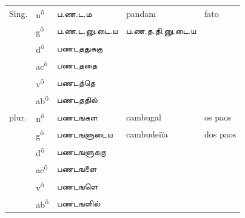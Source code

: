 \documentclass[12pt,a4paper]{scrbook}
\begin{document}
      
\begin{tabular}{lllll}
    
        
          Sing. &
          n\textsuperscript{õ} &
          ப.ண.ட.ம &
          pandam &
          fato \\
    
        
    
        
           &
          g\textsuperscript{õ} &
          ப.ண.ட.னு.டை.ய &
          ப.ண.த.தி.னு.டை.ய \\
    
        
    
        
           &
          d\textsuperscript{õ} &
          பணடததுககு \\
    
        
    
        
           &
          ac\textsuperscript{õ} &
          பணடததை \\
    
        
    
        
           &
          v\textsuperscript{õ} &
          பணடத்தெ \\
    
        
    
        
           &
          ab\textsuperscript{õ} &
          பணடததில் \\
    
        
    
        
          plur. &
          n\textsuperscript{õ} &
          பணடஙகள &
          cambugal &
          os paos \\
    
        
    
        
           &
          g\textsuperscript{õ} &
          பணடஙளுடைய &
          cambudeïïa &
          dos paos \\
    
        
    
        
           &
          d\textsuperscript{õ} &
          பணடஙளுககு \\
    
        
    
        
           &
          ac\textsuperscript{õ} &
          பணடஙளை \\
    
        
    
        
           &
          v\textsuperscript{õ} &
          பணடஙளெ \\
    
        
    
        
           &
          ab\textsuperscript{õ} &
          பணடஙளில் \\
    
        
    
      
\end{tabular}
    
\end{document}
